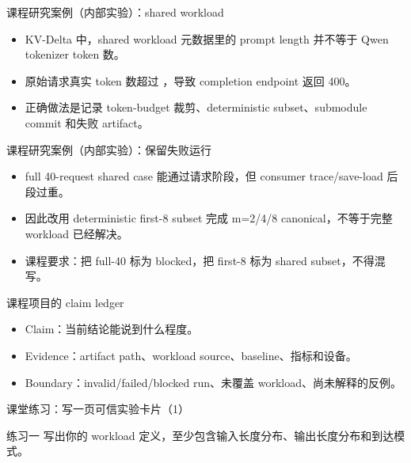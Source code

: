 \begin{frame}{课程研究案例（内部实验）：shared workload}
  \begin{itemize}
    \item KV-Delta 中，shared workload 元数据里的 prompt length 并不等于 Qwen tokenizer token 数。
    \item 原始请求真实 token 数超过 \texttt{}，导致 completion endpoint 返回 400。
    \item 正确做法是记录 token-budget 裁剪、deterministic subset、submodule commit 和失败 artifact。
  \end{itemize}
  \InternalCaseNote
\end{frame}

\begin{frame}{课程研究案例（内部实验）：保留失败运行}
  \begin{itemize}
    \item full 40-request shared case 能通过请求阶段，但 consumer trace/save-load 后段过重。
    \item 因此改用 deterministic first-8 subset 完成 m=2/4/8 canonical，不等于完整 workload 已经解决。
    \item 课程要求：把 full-40 标为 blocked，把 first-8 标为 shared subset，不得混写。
  \end{itemize}
  \InternalCaseNote
\end{frame}

\begin{frame}{课程项目的 claim ledger}
  \begin{itemize}
    \item Claim：当前结论能说到什么程度。
    \item Evidence：artifact path、workload source、baseline、指标和设备。
    \item Boundary：invalid/failed/blocked run、未覆盖 workload、尚未解释的反例。
  \end{itemize}
\end{frame}

\begin{frame}{课堂练习：写一页可信实验卡片（1）}
\begin{block}{练习一}
    写出你的 workload 定义，至少包含输入长度分布、输出长度分布和到达模式。
  \end{block}
\end{frame}

